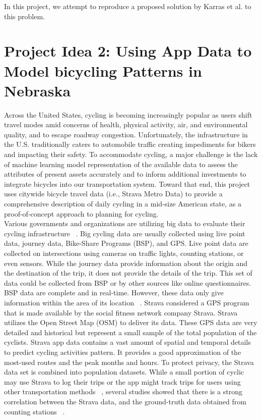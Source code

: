 \documentclass{report}
\begin{document}
In this project, we attempt to reproduce a proposed solution by Karras et al. to this problem. 



\section{Project Idea 2: Using App Data to Model bicycling Patterns in Nebraska}

Across the United States, cycling is becoming increasingly popular as users shift travel modes amid concerns of health, physical activity, air, and environmental quality, and to escape roadway congestion. Unfortunately, the infrastructure in the U.S. traditionally caters to automobile traffic creating impediments for bikers and impacting their safety. To accommodate cycling, a major challenge is the lack of machine learning model representation of the available data to assess the attributes of present assets accurately and to inform additional investments to integrate bicycles into our transportation system. Toward that end, this project uses citywide bicycle travel data (i.e., Strava Metro Data) to provide a comprehensive description of daily cycling in a mid-size American state, as a proof-of-concept approach to planning for cycling. 
\\Various governments and organizations are utilizing big data to evaluate their cycling infrastructure ~\cite{hall2012open}. Big cycling data are usually collected using live point data, journey data, Bike-Share Programs (BSP), and GPS. Live point data are collected on intersections using cameras on traffic lights, counting stations, or even sensors. While the journey data provide information about the origin and the destination of the trip, it does not provide the details of the trip. This set of data could be collected from BSP or by other sources like online questionnaires. BSP data are complete and in real-time. However, these data only give information within the area of its location ~\cite{ romanillos2016big, rogers2000counting}. Strava considered a GPS program that is made available by the social fitness network company Strava. Strava utilizes the Open Street Map (OSM) to deliver its data. These GPS data are very detailed and historical but represent a small sample of the total population of the cyclists.  
Strava app data contains a vast amount of spatial and temporal details to predict cycling activities pattern. It provides a good approximation of the most-used routes and the peak months and hours. To protect privacy, the Strava data set is combined into population datasets. While a small portion of cyclic may use Strava to log their trips or the app might track trips for users using other transportation methods ~\cite{hall2012open, romanillos2016big, fishman2016cycling }, several studies showed that there is a strong correlation between the Strava data, and the ground-truth data obtained from counting stations ~\cite{hong2020evaluation, jestico2016mapping}. 
\end{document}
